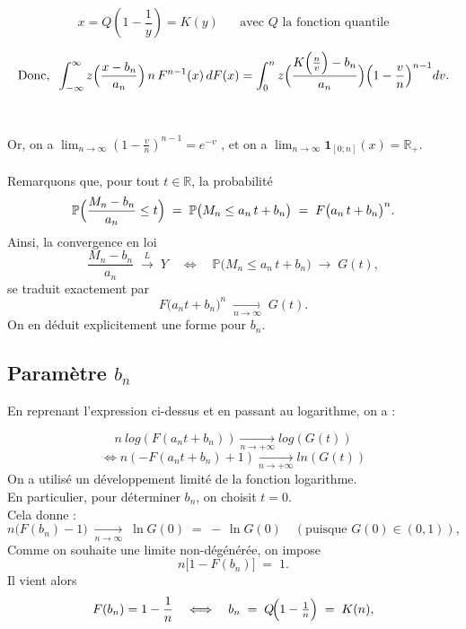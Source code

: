\documentclass{article}
\theoremstyle{plain}
\theoremstyle{definition}
\theoremstyle{plain}
\begin{document}
\[
x = Q(1-\frac{1}{y}) = K(y) \; \; \; \; \; \; \text{avec $Q$ la fonction quantile}
\]

\begin{equation}\label{eq:1.1}
    \text{Donc,} \; \; \int_{-\infty}^{\infty} z\Bigl(\frac{x-b_n}{a_n}\Bigr) \, n \, F^{n-1}(x)\,dF(x)
    =\int_{0}^{n} z\Bigl(\frac{K\Bigl(\frac{n}{v}\Bigr)-b_n}{a_n}\Bigr)
    \Bigl(1-\frac{v}{n}\Bigr)^{n-1}dv.
\end{equation}
\\
\\
Or, on a $\lim_{n \to \infty} ( 1 - \frac{v}{n})^{n-1} = e^{-v}$ , et on a $\lim_{n \to \infty} \mathbf{1}_{[0;n]}(x) = \mathbb{R}_{+}$.
\\
\\
Remarquons que, pour tout $t\in\mathbb R$, la probabilité
\[
\mathbb{P}  \Bigl(\frac{M_n - b_n}{a_n} \le t\Bigr)
\;=\;
\mathbb{P} \bigl(M_n \le a_n\,t + b_n\bigr)
\;=\;
F\bigl(a_n\,t + b_n\bigr)^{n}.
\]
Ainsi, la convergence en loi 
\[
\frac{M_n - b_n}{a_n}\;\overset{L}{\longrightarrow}\;Y
\quad\Longleftrightarrow\quad
\mathbb{P} \bigl(M_n \le a_n\,t + b_n\bigr)
\;\longrightarrow\;
G(t),
\]
se traduit exactement par
\[
F\bigl(a_n t + b_n\bigr)^{n}
\;\xrightarrow[n\to\infty]{}\;
G(t).
\]
On en déduit explicitement une forme pour $b_n$.

\subsection{Paramètre $b_n$}

En reprenant l'expression ci-dessus et en passant au logarithme, on a :

\[
n \: log(F(a_n t + b_n)) \xrightarrow[n\to +\infty]{} log(G(t))
\]
\[
\Longleftrightarrow n(- F(a_n t + b_n) + 1) \xrightarrow[n\to +\infty]{} ln(G(t))
\]
On a utilisé un développement limité de la fonction logarithme. 
\\
En particulier, pour déterminer \(b_n\), on choisit \(t=0\).
\\
Cela donne :
\[
n\bigl(F(b_n)-1\bigr)\;\xrightarrow[n\to\infty]{}\;\ln G(0)
\;=\;-\,\ln G(0)\quad(\text{puisque }G(0)\in(0,1)),
\]
Comme on souhaite une limite non-dégénérée, on impose
\[
n\bigl[1 - F(b_n)\bigr] \;=\; 1.
\]
Il vient alors
\[
F(b_n)=1-\frac1n
\quad\Longleftrightarrow\quad
b_n \;=\; Q\!\Bigl(1-\tfrac1n\Bigr)
\;=\;K(n),
\]
\end{document}
